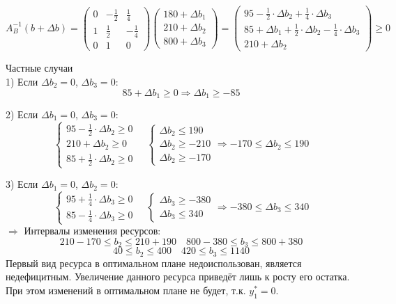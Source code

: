 \documentclass[17pt]{extarticle}
\begin{document}
\[
    A_B^{-1}(b + \Delta b) =
    \begin{pmatrix}
        0 & -\frac{1}{2} & \frac{1}{4}  \\
        1 & \frac{1}{2}  & -\frac{1}{4} \\
        0 & 1            & 0
    \end{pmatrix}
    \begin{pmatrix}
        180 + \Delta b_1 \\
        210 + \Delta b_2 \\
        800 + \Delta b_3
    \end{pmatrix}
    =
    \begin{pmatrix}
        95 - \frac{1}{2} \cdot \Delta b_2 + \frac{1}{4} \cdot \Delta b_3              \\
        85 + \Delta b_1 + \frac{1}{2} \cdot \Delta b_2 - \frac{1}{4} \cdot \Delta b_3 \\
        210 + \Delta b_2
    \end{pmatrix}
    \geq 0
\]

Частные случаи \\
1) Если \( \Delta b_2 = 0 \), \( \Delta b_3 = 0 \):
\[
    85 + \Delta b_1 \geq 0 \Rightarrow \Delta b_1 \geq -85
\]

2) Если \( \Delta b_1 = 0 \), \( \Delta b_3 = 0 \):
\[
    \begin{cases}
        95 - \frac{1}{2} \cdot \Delta b_2 \geq 0 \\
        210 + \Delta b_2 \geq 0                  \\
        85 + \frac{1}{2} \cdot \Delta b_2 \geq 0
    \end{cases}
    \quad \begin{cases}
        \Delta b_2 \leq 190  \\
        \Delta b_2 \geq -210 \\
        \Delta b_2 \geq -170
    \end{cases}
    \Rightarrow -170 \leq \Delta b_2 \leq 190
\]

3) Если \( \Delta b_1 = 0 \), \( \Delta b_2 = 0 \):
\[
    \begin{cases}
        95 + \frac{1}{4} \cdot \Delta b_3 \geq 0 \\
        85 - \frac{1}{4} \cdot \Delta b_3 \geq 0
    \end{cases}
    \quad \begin{cases}
        \Delta b_3 \geq -380 \\
        \Delta b_3 \leq 340
    \end{cases}
    \Rightarrow -380 \leq \Delta b_3 \leq 340
\]
$\Rightarrow$ Интервалы изменения ресурсов:
\[
    210 - 170 \leq b_2 \leq 210 + 190 \quad 800 - 380 \leq b_3 \leq 800 + 380
\]
\[
    40 \leq b_2 \leq 400 \quad 420 \leq b_3 \leq 1140
\]
Первый вид ресурса в оптимальном плане недоиспользован, является недефицитным.
Увеличение данного ресурса приведёт лишь к росту его остатка. При этом изменений в оптимальном плане не будет, т.к. \( y_1^* = 0 \).
\end{document}
